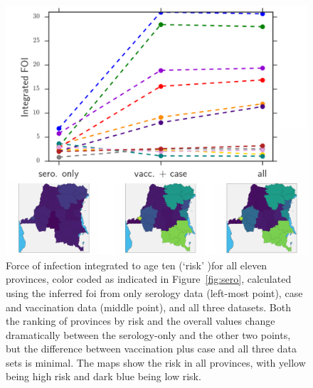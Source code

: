 \documentclass[nofootinbib,aps,pre,twocolumn,superscriptaddress,showkeys,showpacs]{revtex4-1}
\begin{document}
\begin{figure}
\includegraphics[width=\columnwidth,angle=0]{figures/RiskRank-crop.pdf}
\caption{\label{fig:riskrank} Force of infection integrated to age ten (`risk' )for all eleven provinces, color coded as indicated in Figure~\ref{fig:sero}, calculated using the inferred foi from only serology data (left-most point), case and vaccination data (middle point), and all three datasets. Both the ranking of provinces by risk and the overall values change dramatically between the serology-only and the other two points, but the difference between vaccination plus case and all three data sets is minimal. The maps show the risk in all provinces, with yellow being high risk and dark blue being low risk. }
\end{figure}

\end{document}
